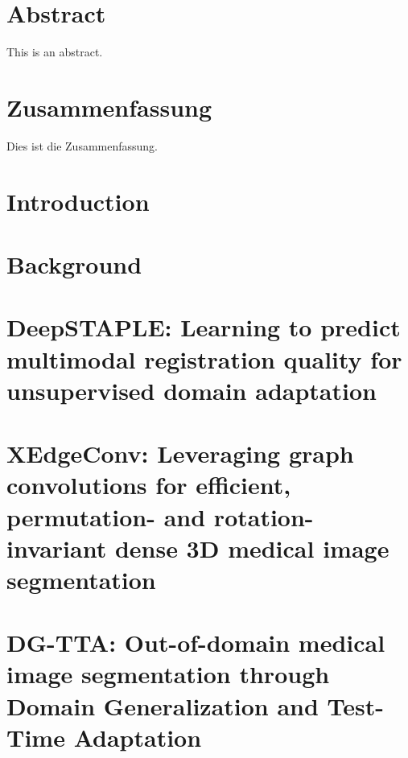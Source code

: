 \documentclass[11pt, a4paper, twoside, headsepline, titlepage, DIV=11, BCOR=12mm, captions=tableheading, chapterprefix=on, numbers=noenddot]{scrbook}
\begin{document}
    \thispagestyle{headings}
    

    \enlargethispage{1\baselineskip}
    \setcounter{page}{1}

    \chapter*{Abstract} %
        This is an abstract.
    \cleardoublepage

    \chapter*{Zusammenfassung} %
        Dies ist die Zusammenfassung.
    \cleardoublepage

    \tableofcontents
    \cleardoublepage

    \chapter{Introduction} %
        

    \chapter{Background} %
        

    \chapter[DeepSTAPLE]{DeepSTAPLE: Learning to predict multimodal registration quality for unsupervised domain adaptation}
        

    \chapter[XEdgeConv]{XEdgeConv: Leveraging graph convolutions for efficient, permutation- and rotation-invariant dense 3D medical image segmentation}
        

    \chapter[DG-TTA]{DG-TTA: Out-of-domain medical image segmentation through Domain Generalization and Test-Time Adaptation}
        
\end{document}
